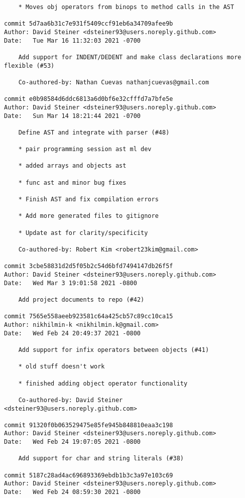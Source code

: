 \documentclass{article}
\begin{document}
\begin{verbatim}
    * Moves obj operators from binops to method calls in the AST

commit 5d7aa6b31c7e931f5409ccf91eb6a34709afee9b
Author: David Steiner <dsteiner93@users.noreply.github.com>
Date:   Tue Mar 16 11:32:03 2021 -0700

    Add support for INDENT/DEDENT and make class declarations more flexible (#53)
    
    Co-authored-by: Nathan Cuevas nathanjcuevas@gmail.com

commit e0b98584d6ddc6813a6d0bf6e32cfffd7a7bfe5e
Author: David Steiner <dsteiner93@users.noreply.github.com>
Date:   Sun Mar 14 18:21:44 2021 -0700

    Define AST and integrate with parser (#48)
    
    * pair programming session ast ml dev
    
    * added arrays and objects ast
    
    * func ast and minor bug fixes
    
    * Finish AST and fix compilation errors
    
    * Add more generated files to gitignore
    
    * Update ast for clarity/specificity
    
    Co-authored-by: Robert Kim <robert23kim@gmail.com>

commit 3cbe58831d2d5f05b2c54d6bfd7494147db26f5f
Author: David Steiner <dsteiner93@users.noreply.github.com>
Date:   Wed Mar 3 19:01:58 2021 -0800

    Add project documents to repo (#42)

commit 7565e558aeeb923581c64a425cb57c89cc10ca15
Author: nikhilmin-k <nikhilmin.k@gmail.com>
Date:   Wed Feb 24 20:49:37 2021 -0800

    Add support for infix operators between objects (#41)
    
    * old stuff doesn't work
    
    * finished adding object operator functionality
    
    Co-authored-by: David Steiner <dsteiner93@users.noreply.github.com>

commit 91320f0b063529475e85fe945b848810eaa3c198
Author: David Steiner <dsteiner93@users.noreply.github.com>
Date:   Wed Feb 24 19:07:05 2021 -0800

    Add support for char and string literals (#38)

commit 5187c28ad4ac696893369ebdb1b3c3a97e103c69
Author: David Steiner <dsteiner93@users.noreply.github.com>
Date:   Wed Feb 24 08:59:30 2021 -0800


\end{verbatim}
\end{document}
